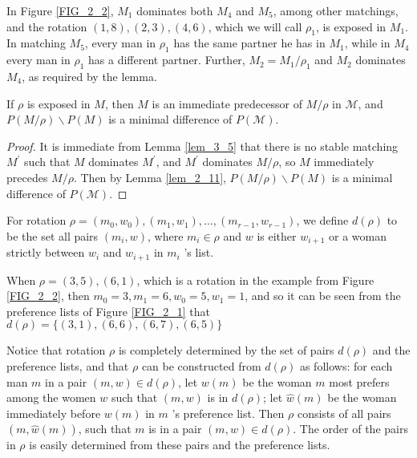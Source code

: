 \begin{exmp}\label{exmp_3_5}
In Figure \ref{FIG_2_2}, $M_1$ dominates both $M_4$ and $M_5$, among other matchings, and the rotation $(1,8),(2,3),(4,6)$, which we will call $\rho_1$, is exposed in $M_1$. In matching $M_5$, every man in $\rho_1$ has the same partner he has in $M_1$, while in $M_4$ every man in $\rho_1$ has a different partner. Further, $M_2=M_1 / \rho_1$ and $M_2$ dominates $M_4$, as required by the lemma.
\end{exmp}

\begin{theorem}\label{thm_3_1}
If $\rho$ is exposed in $M$, then $M$ is an immediate predecessor of $M / \rho$ in $\mathcal{M}$, and $P(M / \rho) \backslash P(M)$ is a minimal difference of $P(\mathcal{M})$.
\end{theorem}

\begin{proof}
    It is immediate from Lemma \ref{lem_3_5} that there is no stable matching $M^{\prime}$ such that $M$ dominates $M^{\prime}$, and $M^{\prime}$ dominates $M / \rho$, so $M$ immediately precedes $M / \rho$. Then by Lemma \ref{lem_2_11}, $P(M / \rho) \backslash P(M)$ is a minimal difference of $P(\mathcal{M})$.
\end{proof}

For rotation $\rho=\left(m_0, w_0\right),\left(m_1, w_1\right), \ldots,\left(m_{r-1}, w_{r-1}\right)$, we define $d(\rho)$ to be the set all pairs $\left(m_i, w\right)$, where $m_i \in \rho$ and $w$ is either $w_{i+1}$ or a woman strictly between $w_i$ and $w_{i+1}$ in $m_i$ 's list.

\begin{exmp}\label{exmp_3_6}
    When $\rho=(3,5),(6,1)$, which is a rotation in the example from Figure \ref{FIG_2_2}, then $m_0=3, m_1=6, w_0=5, w_1=1$, and so it can be seen from the preference lists of Figure \ref{FIG_2_1} that $d(\rho)=\{(3,1),(6,6),(6,7),(6,5)\}$
\end{exmp}

Notice that rotation $\rho$ is completely determined by the set of pairs $d(\rho)$ and the preference lists, and that $\rho$ can be constructed from $d(\rho)$ as follows: for each man $m$ in a pair $(m, w) \in d(\rho)$, let $w(m)$ be the woman $m$ most prefers among the women $w$ such that $(m, w)$ is in $d(\rho)$; let $\hat{w}(m)$ be the woman immediately before $w(m)$ in $m$ 's preference list. Then $\rho$ consists of all pairs $(m, \hat{w}(m))$, such that $m$ is in a pair $(m, w) \in d(\rho)$. The order of the pairs in $\rho$ is easily determined from these pairs and the preference lists.

